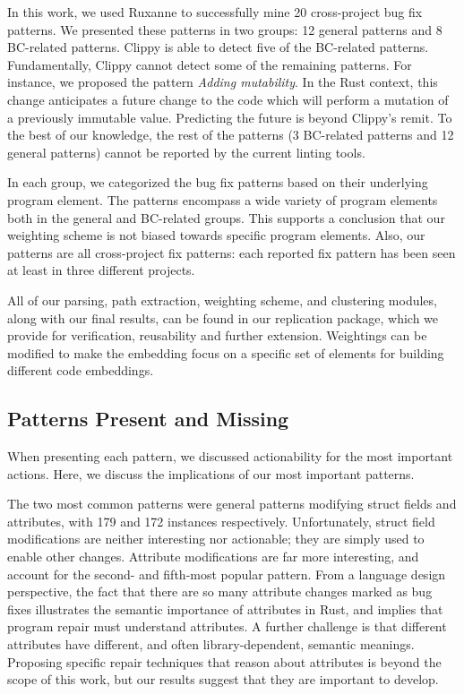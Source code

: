 In this work, we used Ruxanne to successfully mine 20 cross-project bug fix patterns. We presented these patterns in two groups: 12 general patterns and 8 BC-related patterns. Clippy is able to detect five of the BC-related patterns. Fundamentally, Clippy cannot detect some of the remaining patterns. For instance, we proposed the pattern \textit{Adding mutability}. In the Rust context, this change anticipates a future change to the code which will perform a mutation of a previously immutable value. Predicting the future is beyond Clippy's remit. To the best of our knowledge, the rest of the patterns (3 BC-related patterns and 12 general patterns) cannot be reported by the current linting tools. 

In each group, we categorized the bug fix patterns based on their underlying program element. The patterns encompass a wide variety of program elements both in the general and BC-related groups. This supports a conclusion that our weighting scheme is not biased towards specific program elements. Also, our patterns are all cross-project fix patterns: each reported fix pattern has been seen at least in three different projects.

All of our parsing, path extraction, weighting scheme, and clustering modules, along with our final results, can be found in our replication package, which we provide for verification, reusability and further extension. Weightings can be modified to make the embedding focus on a specific set of elements for building different code embeddings.

\subsection{Patterns Present and Missing}

When presenting each pattern, we discussed actionability for the most important actions. Here, we discuss the implications of our most important patterns.

The two most common patterns were general patterns modifying struct fields and attributes, with 179 and 172 instances respectively. Unfortunately, struct field modifications are neither interesting nor actionable; they are simply used to enable other changes. Attribute modifications are far more interesting, and account for the second- and fifth-most popular pattern. From a language design perspective, the fact that there are so many attribute changes marked as bug fixes illustrates the semantic importance of attributes in Rust, and implies that program repair must understand attributes. A further challenge is that different attributes have different, and often library-dependent, semantic meanings. Proposing specific repair techniques that reason about attributes is beyond the scope of this work, but our results suggest that they are important to develop.

